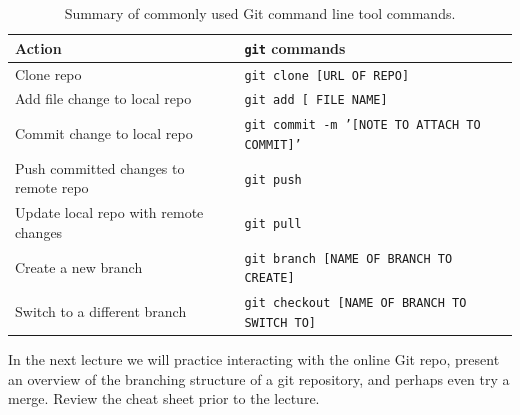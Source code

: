 \begin{table}[htbp!]
    \centering
    \begin{tabular}{l|l} \hline
      Action & \verb|git| commands \\ \hline
         Clone repo &  \texttt{git clone [URL OF REPO]}\\ \hline
         Add file change to local repo &  \texttt{git add [ FILE NAME]} \\
         Commit change to local repo & \texttt{git commit -m '[NOTE TO ATTACH TO COMMIT]'} \\
         Push committed changes to remote repo & \texttt{git push} \\ 
         Update local repo with remote changes & \texttt{git pull} \\ \hline
         Create a new branch & \texttt{git branch [NAME OF BRANCH TO CREATE]}\\
         Switch to a different branch & \texttt{git checkout [NAME OF BRANCH TO SWITCH TO]} \\ \hline
    \end{tabular}
    \caption{Summary of commonly used Git command line tool commands.}
    \label{gitCommands.tab}
\end{table}
\noindent In the next lecture we will  practice interacting with the online Git repo, present an overview of the branching structure of a git repository, and perhaps even try a merge. Review the cheat sheet prior to the lecture.
